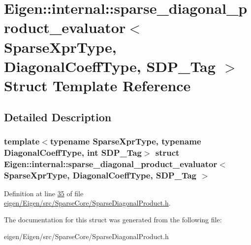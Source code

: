 \hypertarget{struct_eigen_1_1internal_1_1sparse__diagonal__product__evaluator}{}\section{Eigen\+:\+:internal\+:\+:sparse\+\_\+diagonal\+\_\+product\+\_\+evaluator$<$ Sparse\+Xpr\+Type, Diagonal\+Coeff\+Type, S\+D\+P\+\_\+\+Tag $>$ Struct Template Reference}
\label{struct_eigen_1_1internal_1_1sparse__diagonal__product__evaluator}


\subsection{Detailed Description}
\subsubsection*{template$<$typename Sparse\+Xpr\+Type, typename Diagonal\+Coeff\+Type, int S\+D\+P\+\_\+\+Tag$>$\newline
struct Eigen\+::internal\+::sparse\+\_\+diagonal\+\_\+product\+\_\+evaluator$<$ Sparse\+Xpr\+Type, Diagonal\+Coeff\+Type, S\+D\+P\+\_\+\+Tag $>$}



Definition at line \hyperlink{eigen_2_eigen_2src_2_sparse_core_2_sparse_diagonal_product_8h_source_l00035}{35} of file \hyperlink{eigen_2_eigen_2src_2_sparse_core_2_sparse_diagonal_product_8h_source}{eigen/\+Eigen/src/\+Sparse\+Core/\+Sparse\+Diagonal\+Product.\+h}.



The documentation for this struct was generated from the following file\+:\begin{DoxyCompactItemize}
\item 
eigen/\+Eigen/src/\+Sparse\+Core/\+Sparse\+Diagonal\+Product.\+h\end{DoxyCompactItemize}
